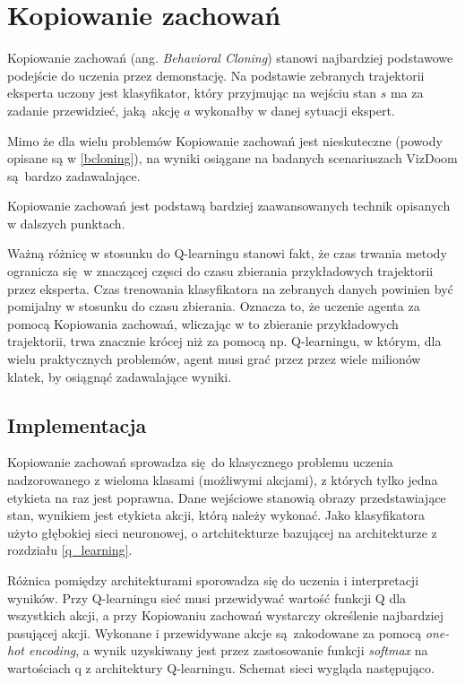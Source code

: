 \section{Kopiowanie zachowań} \label{behavioral_cloning}

Kopiowanie zachowań (ang. \textit{Behavioral Cloning}) stanowi najbardziej podstawowe podejście do uczenia przez demonstację. Na podstawie zebranych trajektorii eksperta uczony jest klasyfikator, który przyjmując na wejściu stan $s$ ma za zadanie przewidzieć, jaką akcję $a$ wykonałby w danej sytuacji ekspert.

Mimo że dla wielu problemów Kopiowanie zachowań jest nieskuteczne (powody opisane są w \ref{bcloning}), na wyniki osiągane na badanych scenariuszach VizDoom są bardzo zadawalające.

Kopiowanie zachowań jest podstawą bardziej zaawansowanych technik opisanych w dalszych punktach.

Ważną różnicę w stosunku do Q-learningu stanowi fakt, że czas trwania metody ogranicza się w znaczącej częsci do czasu zbierania przykładowych trajektorii przez eksperta. Czas trenowania klasyfikatora na zebranych danych powinien być pomijalny w stosunku do czasu zbierania. Oznacza to, że uczenie agenta za pomocą Kopiowania zachowań, wliczając w to zbieranie przykładowych trajektorii, trwa znacznie krócej niż za pomocą np. Q-learningu, w którym, dla wielu praktycznych problemów, agent musi grać przez przez wiele milionów klatek, by osiągnąć zadawalające wyniki. 

\subsection{Implementacja}

Kopiowanie zachowań sprowadza się do klasycznego problemu uczenia nadzorowanego z wieloma klasami (możliwymi akcjami), z których tylko jedna etykieta na raz jest poprawna. Dane wejściowe stanowią obrazy przedstawiające stan, wynikiem jest etykieta akcji, którą należy wykonać. Jako klasyfikatora użyto głębokiej sieci neuronowej, o artchitekturze bazującej na architekturze z rozdziału \ref{q_learning}.

Różnica pomiędzy architekturami sporowadza się do uczenia i interpretacji wyników. Przy Q-learningu sieć musi przewidywać wartość funkcji Q dla wszystkich akcji, a przy Kopiowaniu zachowań wystarczy określenie najbardziej pasującej akcji. Wykonane i przewidywane akcje są zakodowane za pomocą \textit{one-hot encoding}, a wynik uzyskiwany jest przez zastosowanie funkcji \textit{softmax} na wartościach q z architektury Q-learningu. Schemat sieci wygląda następująco.

